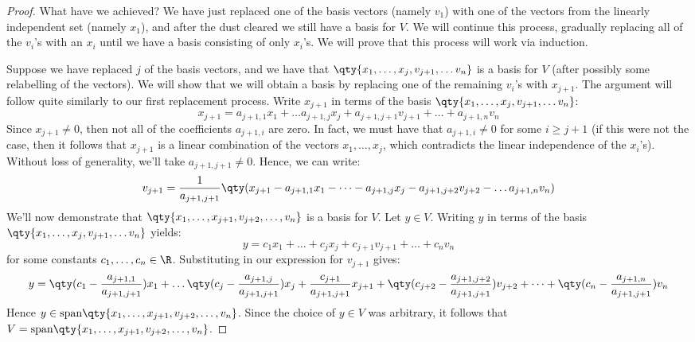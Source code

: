 \begin{proof}
  \vspace{3mm}

  What have we achieved? We have just replaced one of the basis vectors (namely \( v_1 \)) with one of the vectors from the linearly independent set (namely \( x_1 \)), and after the dust cleared we still have a basis for \( V \). We will continue this process, gradually replacing all of the \( v_i \)'s with an \( x_i \) until we have a basis consisting of only \( x_i \)'s. We will prove that this process will work via induction.

  \vspace{3mm}

  Suppose we have replaced \( j \) of the basis vectors, and we have that \( \qty{x_1,\dots, x_j, v_{j+1},\dots v_n} \) is a basis for \( V \) (after possibly some relabelling of the vectors). We will show that we will obtain a basis by replacing one of the remaining \( v_i \)'s with \( x_{j+1} \). The argument will follow quite similarly to our first replacement process. Write \( x_{j+1} \) in terms of the basis \( \qty{x_1,\dots, x_j, v_{j+1},\dots v_n} \):
  \[ x_{j+1}=a_{j+1,1}x_1+\dots a_{j+1,j}x_j+a_{j+1,j+1}v_{j+1}+\dots+a_{j+1,n}v_n \]
  Since \( x_{j+1}\neq 0 \), then not all of the coefficients \( a_{j+1,i} \) are zero. In fact, we must have that \( a_{j+1,i}\neq 0 \) for some \( i\geq j+1 \) (if this were not the case, then it follows that \( x_{j+1} \) is a linear combination of the vectors \( x_1,\dots, x_j \), which contradicts the linear independence of the \( x_i \)'s). Without loss of generality, we'll take \( a_{j+1,j+1}\neq 0 \). Hence, we can write:
  \[ v_{j+1}=\frac{1}{a_{j+1,j+1}}\qty(x_{j+1}-a_{j+1,1}x_1-\dots -a_{j+1,j}x_j-a_{j+1,j+2}v_{j+2}-\dots a_{j+1,n}v_n) \]
  We'll now demonstrate that \( \qty{x_1,\dots,x_{j+1},v_{j+2},\dots,v_n} \) is a basis for \( V \). Let \( y\in V \). Writing \( y \) in terms of the basis \( \qty{x_1,\dots, x_j, v_{j+1},\dots v_n} \) yields:
  \[ y=c_1x_1+\dots+c_jx_j+c_{j+1}v_{j+1}+\dots+c_nv_n \]
  for some constants \( c_1,\dots,c_n\in\R \). Substituting in our expression for \( v_{j+1} \) gives:
  \[ y=\qty(c_1-\frac{a_{j+1,1}}{a_{j+1,j+1}})x_1+\dots\qty(c_j-\frac{a_{j+1,j}}{a_{j+1,j+1}})x_j+\frac{c_{j+1}}{a_{j+1,j+1}}x_{j+1}+\qty(c_{j+2}-\frac{a_{j+1,j+2}}{a_{j+1,j+1}})v_{j+2}+\dots+\qty(c_n-\frac{a_{j+1,n}}{a_{j+1,j+1}})v_n \]
  Hence \( y\in\text{span}\qty{x_1,\dots,x_{j+1},v_{j+2},\dots,v_n} \). Since the choice of \( y\in V \) was arbitrary, it follows that \( V=\text{span}\qty{x_1,\dots,x_{j+1},v_{j+2},\dots,v_n} \).


\end{proof}
